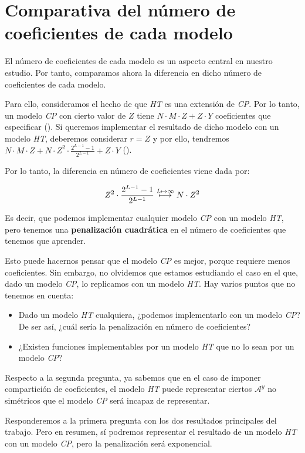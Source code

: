 \section{Comparativa del número de coeficientes de cada modelo}

El número de coeficientes de cada modelo es un aspecto central en nuestro estudio. Por tanto, comparamos ahora la diferencia en dicho número de coeficientes de cada modelo.

Para ello, consideramos el hecho de que \textit{HT} es una extensión de \textit{CP}. Por lo tanto, un modelo \textit{CP} con cierto valor de $Z$ tiene  $N \cdot M \cdot Z + Z \cdot Y$ coeficientes que especificar (). Si queremos implementar el resultado de dicho modelo con un modelo \textit{HT}, deberemos considerar $r = Z$ y por ello, tendremos $N \cdot M \cdot Z + N \cdot Z^2 \cdot \frac{2^{L-1} - 1}{2^{L-1}} + Z \cdot Y$ ().

Por lo tanto, la diferencia en número de coeficientes viene dada por:

\begin{equation}
	Z^2 \cdot \frac{2^{L-1} - 1}{2^{L-1}} \stackrel{L \mapsto \infty}{\longmapsto} N \cdot Z^2
\end{equation}

Es decir, que podemos implementar cualquier modelo \textit{CP} con un modelo \textit{HT}, pero tenemos una \textbf{penalización cuadrática} en el número de coeficientes que tenemos que aprender.

Esto puede hacernos pensar que el modelo \textit{CP} es mejor, porque requiere menos coeficientes. Sin embargo, no olvidemos que estamos estudiando el caso en el que, dado un modelo \textit{CP}, lo replicamos con un modelo \textit{HT}. Hay varios puntos
que no tenemos en cuenta:

\begin{itemize}
	\item Dado un modelo \textit{HT} cualquiera, ¿podemos implementarlo con un modelo \textit{CP}? De ser así, ¿cuál sería la penalización en número de coeficientes?
	\item ¿Existen funciones implementables por un modelo \textit{HT} que no lo sean por un modelo \textit{CP}?
\end{itemize}

Respecto a la segunda pregunta, ya sabemos que en el caso de imponer compartición de coeficientes, el modelo \textit{HT} puede representar ciertos $\mathcal{A}^y$ no simétricos que el modelo \textit{CP} será incapaz de representar.

Responderemos a la primera pregunta con los dos resultados principales del trabajo. Pero en resumen, sí podremos representar el resultado de un modelo \textit{HT} con un modelo \textit{CP}, pero la penalización será exponencial.
